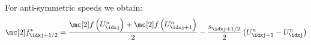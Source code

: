\begin{corbox}\nospacing
    \begin{cor}[\hfill\tcblack{$-s^{l}_{\idxj+1/2}=s^{r}_{\idxj+1/2}=:s_{\idxj+1/2}$}\newline Symmetric Waves]\label{cor:symmetric_waves}\leavevmode\\
        For anti-symmetric speeds we obtain:
        \begin{align}
          \flux^{*}_{\idxj+1/2}=\frac{\flux\left(U_{\idxj}^{n}\right)+\flux \left(U_{\idxj+1}^{n}\right)}{2}-\frac{s_{\idxj+1/2}}{2}\left(U_{\idxj+1}^{n}-U_{\idxj}^{n}\right)
          \label{eq:central_scheme_symmetric_waves}
        \end{align}
    \end{cor}
\end{corbox}
